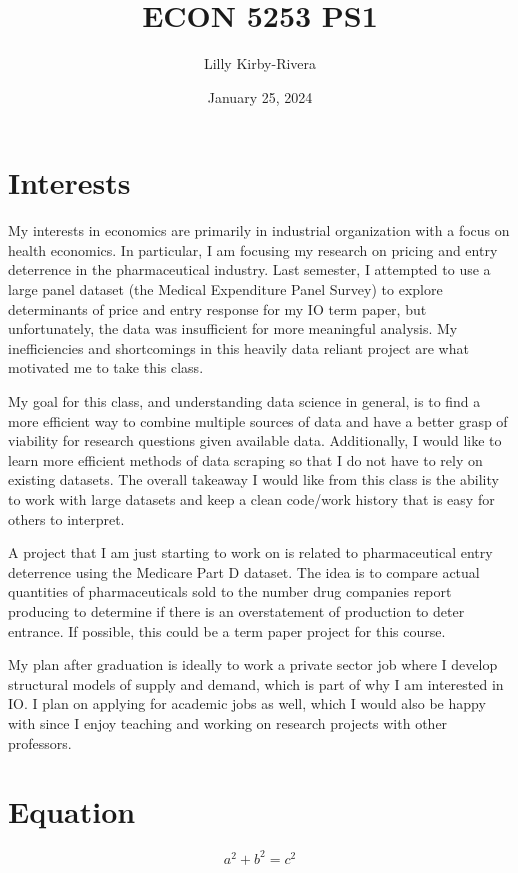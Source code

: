 \documentclass{article}
\title{ECON 5253 PS1}
\author{Lilly Kirby-Rivera }
\date{January 25, 2024}
\begin{document}
\maketitle

\section{Interests}
\par My interests in economics are primarily in industrial organization with a focus on health economics. In particular, I am focusing my research on pricing and entry deterrence in the pharmaceutical industry. Last semester, I attempted to use a large panel dataset (the Medical Expenditure Panel Survey) to explore determinants of price and entry response for my IO term paper, but unfortunately, the data was insufficient for more meaningful analysis. My inefficiencies and shortcomings in this heavily data reliant project are what motivated me to take this class.
\par My goal for this class, and understanding data science in general, is to find a more efficient way to combine multiple sources of data and have a better grasp of viability for research questions given available data. Additionally, I would like to learn more efficient methods of data scraping so that I do not have to rely on existing datasets. The overall takeaway I would like from this class is the ability to work with large datasets and keep a clean code/work history that is easy for others to interpret.
\par A project that I am just starting to work on is related to pharmaceutical entry deterrence using the Medicare Part D dataset. The idea is to compare actual quantities of pharmaceuticals sold to the number drug companies report producing to determine if there is an overstatement of production to deter entrance. If possible, this could be a term paper project for this course.
\par My plan after graduation is ideally to work a private sector job where I develop structural models of supply and demand, which is part of why I am interested in IO. I plan on applying for academic jobs as well, which I would also be happy with since I enjoy teaching and working on research projects with other professors.

\section{Equation}
\[a^2 + b^2 = c^2\]
\end{document}

